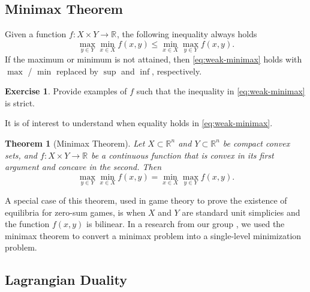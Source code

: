 \documentclass[
]{book}
\newtheorem{theorem}{Theorem}[chapter]
\theoremstyle{definition}
\theoremstyle{definition}
\theoremstyle{definition}
\newtheorem{exercise}{Exercise}[chapter]
\theoremstyle{definition}
\theoremstyle{remark}
\begin{document}
\hypertarget{minimax-theorem}{%
\subsection{Minimax Theorem}\label{minimax-theorem}}

Given a function \(f: X \times Y \rightarrow \mathbb{R}^{}\), the following inequality always holds
\begin{equation}
\max_{y \in Y} \min_{x \in X} f(x,y) \leq \min_{x \in X} \max_{y \in Y} f(x,y).
\label{eq:weak-minimax}
\end{equation}
If the maximum or minimum is not attained, then \eqref{eq:weak-minimax} holds with \(\max\) / \(\min\) replaced by \(\sup\) and \(\inf\), respectively.

\begin{exercise}
Provide examples of \(f\) such that the inequality in \eqref{eq:weak-minimax} is strict.
\end{exercise}

It is of interest to understand when equality holds in \eqref{eq:weak-minimax}.

\begin{theorem}[Minimax Theorem]
\protect\hypertarget{thm:minimax}{}\label{thm:minimax}Let \(X \subset \mathbb{R}^{n}\) and \(Y \subset \mathbb{R}^{n}\) be compact convex sets, and \(f: X \times Y \rightarrow \mathbb{R}^{}\) be a continuous function that is convex in its first argument and concave in the second. Then
\[
\max_{y \in Y} \min_{x \in X} f(x,y) = \min_{x \in X} \max_{y \in Y} f(x,y).
\]
\end{theorem}

A special case of this theorem, used in game theory to prove the existence of equilibria for zero-sum games, is when \(X\) and \(Y\) are standard unit simplicies and the function \(f(x,y)\) is bilinear. In a research from our group \citep{tang23arxiv-uncertainty}, we used the minimax theorem to convert a minimax problem into a single-level minimization problem.

\hypertarget{background:convex:optimization:Lagrangian}{%
\subsection{Lagrangian Duality}\label{background:convex:optimization:Lagrangian}}
\end{document}
